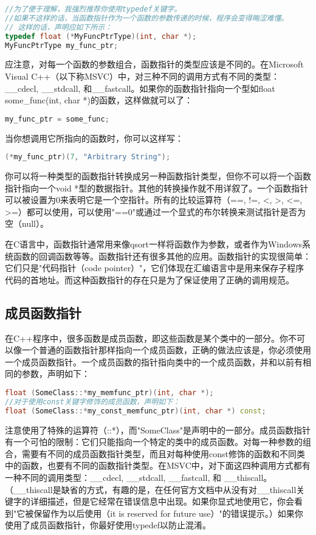 \documentclass{article}
\begin{document}
\begin{CJK}{UTF8}{gbsn}
\begin{lstlisting}[language=c++]
//为了便于理解，我强烈推荐你使用typedef关键字。
//如果不这样的话，当函数指针作为一个函数的参数传递的时候，程序会变得晦涩难懂。
// 这样的话，声明应如下所示：
typedef float (*MyFuncPtrType)(int, char *);
MyFuncPtrType my_func_ptr;
\end{lstlisting}

应注意，对每一个函数的参数组合，函数指针的类型应该是不同的。在Microsoft Visual C++（以下称MSVC）中，对三种不同的调用方式有不同的类型：\_\_cdecl, \_\_stdcall, 和\_\_fastcall。如果你的函数指针指向一个型如float some\_func(int, char *)的函数，这样做就可以了：
\begin{lstlisting}[language=c++]
my_func_ptr = some_func;
\end{lstlisting}
当你想调用它所指向的函数时，你可以这样写：
\begin{lstlisting}[language=c++]
(*my_func_ptr)(7, "Arbitrary String");
\end{lstlisting}
你可以将一种类型的函数指针转换成另一种函数指针类型，但你不可以将一个函数指针指向一个void *型的数据指针。其他的转换操作就不用详叙了。一个函数指针可以被设置为0来表明它是一个空指针。所有的比较运算符（==, !=, <, >, <=, >=）都可以使用，可以使用"==0"或通过一个显式的布尔转换来测试指针是否为空（null）。

在C语言中，函数指针通常用来像qsort一样将函数作为参数，或者作为Windows系统函数的回调函数等等。函数指针还有很多其他的应用。函数指针的实现很简单：它们只是"代码指针（code pointer）"，它们体现在汇编语言中是用来保存子程序代码的首地址。而这种函数指针的存在只是为了保证使用了正确的调用规范。

\subsection{成员函数指针}
在C++程序中，很多函数是成员函数，即这些函数是某个类中的一部分。你不可以像一个普通的函数指针那样指向一个成员函数，正确的做法应该是，你必须使用一个成员函数指针。一个成员函数的指针指向类中的一个成员函数，并和以前有相同的参数，声明如下：
\begin{lstlisting}[language=c++]
float (SomeClass::*my_memfunc_ptr)(int, char *);
//对于使用const关键字修饰的成员函数，声明如下：
float (SomeClass::*my_const_memfunc_ptr)(int, char *) const;
\end{lstlisting}
注意使用了特殊的运算符（::*），而"SomeClass"是声明中的一部分。成员函数指针有一个可怕的限制：它们只能指向一个特定的类中的成员函数。对每一种参数的组合，需要有不同的成员函数指针类型，而且对每种使用const修饰的函数和不同类中的函数，也要有不同的函数指针类型。在MSVC中，对下面这四种调用方式都有一种不同的调用类型：\_\_cdecl, \_\_stdcall, \_\_fastcall, 和 \_\_thiscall。（\_\_thiscall是缺省的方式，有趣的是，在任何官方文档中从没有对\_\_thiscall关键字的详细描述，但是它经常在错误信息中出现。如果你显式地使用它，你会看到"它被保留作为以后使用（it is reserved for future use）"的错误提示。）如果你使用了成员函数指针，你最好使用typedef以防止混淆。


\end{CJK}
\end{document}
